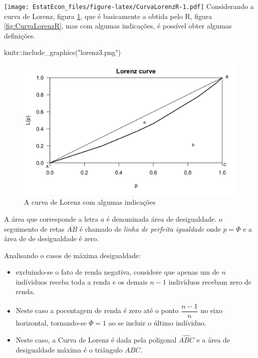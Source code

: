 \documentclass[
]{book}
\newenvironment{Shaded}{\begin{snugshade}}{\end{snugshade}}
\newcommand{\FunctionTok}[1]{\textcolor[rgb]{0.00,0.00,0.00}{#1}}
\newcommand{\NormalTok}[1]{#1}
\newcommand{\SpecialCharTok}[1]{\textcolor[rgb]{0.00,0.00,0.00}{#1}}
\newcommand{\StringTok}[1]{\textcolor[rgb]{0.31,0.60,0.02}{#1}}
\providecommand{\tightlist}{%
  \setlength{\itemsep}{0pt}\setlength{\parskip}{0pt}}
\begin{document}
\texttt{[image: EstatEcon\_files/figure-latex/CurvaLorenzR-1.pdf]}
Considerando a curva de Lorenz, figura \ref{fig:CurvaLorenz}, que é basicamente a obtida pelo R, figura \ref{fig:CurvaLorenzR}, mas com algumas indicações, é possível obter algumas definições.

\begin{Shaded}
\begin{Highlighting}[]
\NormalTok{knitr}\SpecialCharTok{::}\FunctionTok{include\_graphics}\NormalTok{(}\StringTok{"lorenz3.png"}\NormalTok{)}
\end{Highlighting}
\end{Shaded}

\begin{figure}

{\centering \includegraphics[width=1\linewidth]{lorenz3} 

}

\caption{A curva de Lorenz com algumas indicações}\label{fig:CurvaLorenz}
\end{figure}

A área que corresponde a letra \(a\) é denominada área de desigualdade. o seguimento de retas \(\overline{AB}\) é chamado de \emph{linha de perfeita igualdade} onde \(p=\Phi\) e a área de de desigualdade é zero.

Analisando o casos de máxima desigualdade:

\begin{itemize}
\tightlist
\item
  excluindo-se o fato de renda negativa, considere que apenas um de \(n\) indíviduos receba toda a renda e os demais \(n-1\) indivíduos recebam zero de renda.
\item
  Neste caso a pocentagem de renda é zero até o ponto \(\dfrac{n-1}{n}\) no eixo horizontal, tornando-se \(\Phi = 1\) ao se incluir o último indíviduo.
\item
  Neste caso, a Curva de Lorenz é dada pela poligonal \(\widehat{ABC}\) e a área de desigualdade máxima é o triângulo \(ABC\).
\end{itemize}
\end{document}
